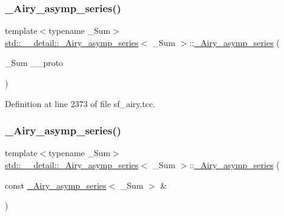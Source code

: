 \subsubsection{\texorpdfstring{\+\_\+\+Airy\+\_\+asymp\+\_\+series()}{\_Airy\_asymp\_series()}\hspace{0.1cm}{\footnotesize\ttfamily [1/3]}}
{\footnotesize\ttfamily template$<$typename \+\_\+\+Sum$>$ \\
\hyperlink{classstd_1_1____detail_1_1__Airy__asymp__series}{std\+::\+\_\+\+\_\+detail\+::\+\_\+\+Airy\+\_\+asymp\+\_\+series}$<$ \+\_\+\+Sum $>$\+::\hyperlink{classstd_1_1____detail_1_1__Airy__asymp__series}{\+\_\+\+Airy\+\_\+asymp\+\_\+series} (\begin{DoxyParamCaption}\item[{\+\_\+\+Sum}]{\+\_\+\+\_\+proto }\end{DoxyParamCaption})\hspace{0.3cm}{\ttfamily [inline]}}



Definition at line 2373 of file sf\+\_\+airy.\+tcc.

\mbox{\label{classstd_1_1____detail_1_1__Airy__asymp__series_a48eab98c05f50ad5b5f00f1ad9628e14}} 
\subsubsection{\texorpdfstring{\+\_\+\+Airy\+\_\+asymp\+\_\+series()}{\_Airy\_asymp\_series()}\hspace{0.1cm}{\footnotesize\ttfamily [2/3]}}
{\footnotesize\ttfamily template$<$typename \+\_\+\+Sum$>$ \\
\hyperlink{classstd_1_1____detail_1_1__Airy__asymp__series}{std\+::\+\_\+\+\_\+detail\+::\+\_\+\+Airy\+\_\+asymp\+\_\+series}$<$ \+\_\+\+Sum $>$\+::\hyperlink{classstd_1_1____detail_1_1__Airy__asymp__series}{\+\_\+\+Airy\+\_\+asymp\+\_\+series} (\begin{DoxyParamCaption}\item[{const \hyperlink{classstd_1_1____detail_1_1__Airy__asymp__series}{\+\_\+\+Airy\+\_\+asymp\+\_\+series}$<$ \+\_\+\+Sum $>$ \&}]{ }\end{DoxyParamCaption})\hspace{0.3cm}{\ttfamily [default]}}

